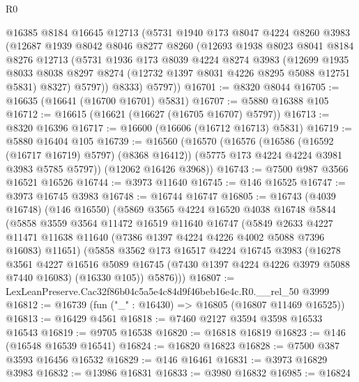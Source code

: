 \begin{lexlean}{R0}
\begin{coremodule}
      @16385
      @8184
      @16645
      @12713
      (@5731
        @1940
        @173
        @8047
        @4224
        @8260
        @3983
        (@12687
          @1939
          @8042
          @8046
          @8277
          @8260
          (@12693
            @1938
            @8023
            @8041
            @8184
            @8276
            @12713
            (@5731
              @1936
              @173
              @8039
              @4224
              @8274
              @3983
              (@12699
                @1935
                @8033
                @8038
                @8297
                @8274
                (@12732 @1397 @8031 @4226 @8295 @5088 @12751 @5831)
                @8327)
              @5797))
          @8333)
        @5797))
@16701 := @8320 @8044
@16705 := @16635 (@16641 (@16700 @16701) @5831)
@16707 := @5880 @16388 @105
@16712 := @16615 (@16621 (@16627 (@16705 @16707) @5797))
@16713 := @8320 @16396
@16717 := @16600 (@16606 (@16712 @16713) @5831)
@16719 := @5880 @16404 @105
@16739 := @16560
    (@16570
      (@16576
        (@16586 (@16592 (@16717 @16719) @5797) (@8368 @16412))
        (@5775 @173 @4224 @4224 @3981 @3983 @5785 @5797))
      (@12062 @16426 @3968))
@16743 := @7500 @987 @3566 @16521 @16526
@16744 := @3973 @11640
@16745 := @146 @16525
@16747 := @3973 @16745 @3983
@16748 := @16744 @16747
@16805 := @16743
    (@4039 @16748)
    (@146 @16550)
    (@5869
      @3565
      @4224
      @16520
      @4038
      @16748
      @5844
      (@5858
        @3559
        @3564
        @11472
        @16519
        @11640
        @16747
        (@5849
          @2633
          @4227
          @11471
          @11638
          @11640
          (@7386 @1397 @4224 @4226 @4002 @5088 @7396 @16083)
          @11651)
        (@5858
          @3562
          @173
          @16517
          @4224
          @16745
          @3983
          (@16278
            @3561
            @4227
            @16516
            @5089
            @16745
            (@7430 @1397 @4224 @4226 @3979 @5088 @7440 @16083)
            (@16330 @105))
          @5876)))
@16807 := LexLeanPreserve.Cac32f86b04c5a5e4c84d9f46beb16e4c.R0.__rel_50 @3999
@16812 := @16739 (fun ("_" : @16430) => @16805 (@16807 @11469 @16525))
@16813 := @16429 @4561
@16818 := @7460 @2127 @3594 @3598 @16533 @16543
@16819 := @9705 @16538
@16820 := @16818 @16819
@16823 := @146 (@16548 @16539 @16541)
@16824 := @16820 @16823
@16828 := @7500 @387 @3593 @16456 @16532
@16829 := @146 @16461
@16831 := @3973 @16829 @3983
@16832 := @13986 @16831
@16833 := @3980 @16832
@16985 := @16824

\end{coremodule}
\end{lexlean}

